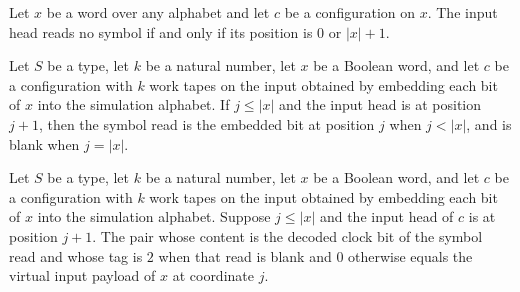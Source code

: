 \begin{lemma}
\label{Complexity.inputSymbol_blank}
\leanok
{}
Let $x$ be a word over any alphabet and let $c$ be a configuration on $x$. The input
head reads no symbol if and only if its position is $0$ or $|x|+1$.
\end{lemma}

\begin{lemma}
\label{Complexity.copy_input_read}
\leanok
{}
Let $S$ be a type, let $k$ be a natural number, let $x$ be a Boolean word, and let $c$
be a configuration with $k$ work tapes on the input obtained by embedding each bit of
$x$ into the simulation alphabet. If $j\le |x|$ and the input head is at position $j+1$,
then the symbol read is the embedded bit at position $j$ when $j<|x|$, and is blank when
$j=|x|$.
\end{lemma}

\begin{lemma}
\label{Complexity.copy_input_payload}
\leanok
{}
Let $S$ be a type, let $k$ be a natural number, let $x$ be a Boolean word, and let $c$
be a configuration with $k$ work tapes on the input obtained by embedding each bit of
$x$ into the simulation alphabet. Suppose $j\le |x|$ and the input head of $c$ is at
position $j+1$. The pair whose content is the decoded clock bit of the symbol read and
whose tag is $2$ when that read is blank and $0$ otherwise equals the virtual input
payload of $x$ at coordinate $j$.
\end{lemma}

